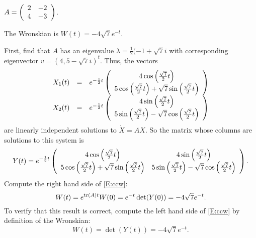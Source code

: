 \documentclass{ximera}
\begin{document}
\begin{exercise} 	\label{c14.w.3c}
$A = \left(\begin{array}{rr} 2 & -2\\ 4 &-3\end{array}\right)$.

\begin{solution}
\ans The Wronskian is $W(t) = -4\sqrt{7}e^{-t}$.

\soln First, find that $A$ has an eigenvalue $\lambda =
\frac{1}{2}(-1 + \sqrt{7}i$ with corresponding
eigenvector $v = (4,5 - \sqrt{7}i)^t$.  Thus, the vectors
\[
\begin{array}{rcl}
X_1(t) & = & e^{-\frac{1}{2}t}\left(\begin{array}{c} 4\cos\left(\frac{\sqrt{7}}{2}t\right) \\ 5\cos\left(\frac{\sqrt{7}}{2}t\right) +
\sqrt{7}\sin\left(\frac{\sqrt{7}}{2}t\right)\end{array}\right) \\
X_2(t) & = & e^{-\frac{1}{2}t}\left(\begin{array}{c} 4\sin\left(\frac{\sqrt{7}}{2}t\right) \\ 5\sin\left(\frac{\sqrt{7}}{2}t\right) -
\sqrt{7}\cos\left(\frac{\sqrt{7}}{2}t\right)\end{array}\right)
\end{array}
\]
are linearly independent solutions to $\dot{X} = AX$.  So the matrix
whose columns are solutions to this system is
\[
Y(t) = e^{-\frac{1}{2}t}\left(\begin{array}{cc} 4\cos\left(\frac{\sqrt{7}}{2}t\right) & 4\sin\left(\frac{\sqrt{7}}{2}t\right)\\ 5\cos\left(\frac{\sqrt{7}}{2}t\right) +
\sqrt{7}\sin\left(\frac{\sqrt{7}}{2}t\right) &5\sin\left(\frac{\sqrt{7}}{2}t\right) -
\sqrt{7}\cos\left(\frac{\sqrt{7}}{2}t\right)\end{array}\right).
\]
Compute the right hand side of \eqref{E:ccw}:
\[
W(t) = e^{{\rm tr}(A)t}W(0) = e^{-t}\det(Y(0)) = -4\sqrt{7}e^{-t}.
\]
To verify that this result is correct, compute the left hand side of
\eqref{E:ccw} by definition of the Wronskian:
\[
W(t) = \det(Y(t)) = -4\sqrt{7}e^{-t}.
\]




\end{solution}
\end{exercise}
\end{document}
